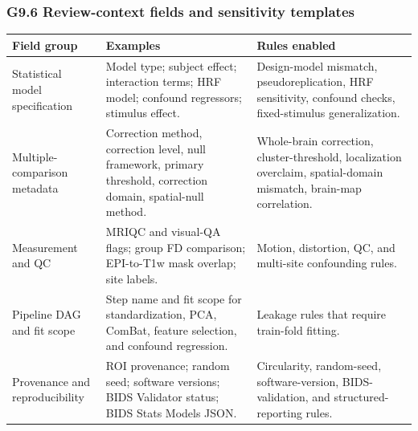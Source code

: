 \clearpage
\subsubsection{\texorpdfstring{\textbf{G9.6 Review-context fields and sensitivity templates}}{G9.6 Review-context fields and sensitivity templates}}

\begin{longtable}{|>{\RaggedRight\hspace{0pt}\arraybackslash}p{}|>{\RaggedRight\hspace{0pt}\arraybackslash}p{}|>{\RaggedRight\hspace{0pt}\arraybackslash}p{}|}
\hline
\rowcolor{brtablehead}\textbf{Field group} & \textbf{Examples} & \textbf{Rules enabled} \\
\hline
Statistical model specification & Model type; subject effect; interaction terms; HRF model; confound regressors; stimulus effect. & Design-model mismatch, pseudoreplication, HRF sensitivity, confound checks, fixed-stimulus generalization. \\
\hline
Multiple-comparison metadata & Correction method, correction level, null framework, primary threshold, correction domain, spatial-null method. & Whole-brain correction, cluster-threshold, localization overclaim, spatial-domain mismatch, brain-map correlation. \\
\hline
Measurement and QC & MRIQC and visual-QA flags; group FD comparison; EPI-to-T1w mask overlap; site labels. & Motion, distortion, QC, and multi-site confounding rules. \\
\hline
Pipeline DAG and fit scope & Step name and fit scope for standardization, PCA, ComBat, feature selection, and confound regression. & Leakage rules that require train-fold fitting. \\
\hline
Provenance and reproducibility & ROI provenance; random seed; software versions; BIDS Validator status; BIDS Stats Models JSON. & Circularity, random-seed, software-version, BIDS-validation, and structured-reporting rules. \\
\hline
\end{longtable}

